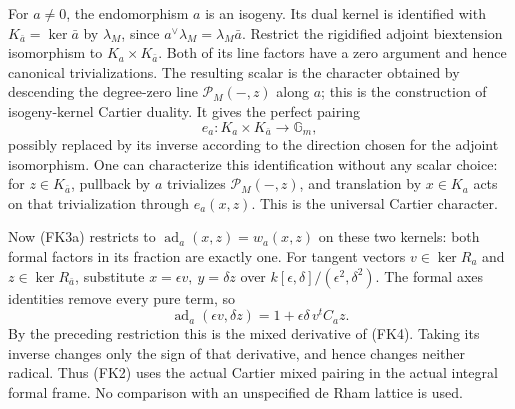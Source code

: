 For \(a\ne0\), the endomorphism \(a\) is an isogeny.
Its dual kernel is identified with \(K_{\bar a}=\ker\bar a\)
by \(\lambda_M\), since
\(a^\vee\lambda_M=\lambda_M\bar a\).
Restrict the rigidified adjoint biextension isomorphism to
\(K_a\times K_{\bar a}\).
Both of its line factors have a zero argument and hence
canonical trivializations.
The resulting scalar is the character obtained by
descending the degree-zero line
\(\mathcal P_M(-,z)\) along \(a\); this is the construction
of isogeny-kernel Cartier duality.
It gives the perfect pairing
\[
                         e_a:K_a\times K_{\bar a}\to\mathbb G_m,
 \tag{FK4}
\]
possibly replaced by its inverse according to the direction
chosen for the adjoint isomorphism.
One can characterize this identification without any scalar
choice: for \(z\in K_{\bar a}\), pullback by \(a\) trivializes
\(\mathcal P_M(-,z)\), and translation by \(x\in K_a\)
acts on that trivialization through \(e_a(x,z)\).
This is the universal Cartier character.

Now (FK3a) restricts to
\(\operatorname{ad}_a(x,z)=w_a(x,z)\) on these two kernels:
both formal factors in its fraction are exactly one.
For tangent vectors \(v\in\ker R_a\) and
\(z\in\ker R_{\bar a}\), substitute
\(x=\epsilon v,\ y=\delta z\) over
\(k[\epsilon,\delta]/(\epsilon^2,\delta^2)\).
The formal axes identities remove every pure term, so
\[
 \operatorname{ad}_a(\epsilon v,\delta z)
                   =1+\epsilon\delta\,v^tC_a z.
 \tag{FK5}
\]
By the preceding restriction this is the mixed derivative
of (FK4).  Taking its inverse changes only the sign of that
derivative, and hence changes neither radical.
Thus (FK2) uses the actual Cartier mixed pairing in the
actual integral formal frame.  No comparison with an
unspecified de Rham lattice is used.

